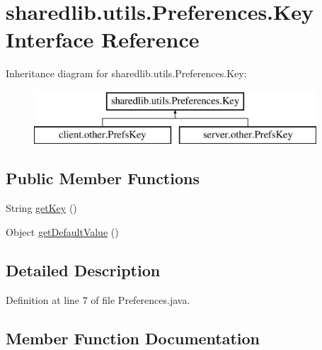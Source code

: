 \hypertarget{interfacesharedlib_1_1utils_1_1_preferences_1_1_key}{}\section{sharedlib.\+utils.\+Preferences.\+Key Interface Reference}
\label{interfacesharedlib_1_1utils_1_1_preferences_1_1_key}
Inheritance diagram for sharedlib.\+utils.\+Preferences.\+Key\+:\begin{figure}[H]
\begin{center}
\leavevmode
\includegraphics[height=2.000000cm]{interfacesharedlib_1_1utils_1_1_preferences_1_1_key}
\end{center}
\end{figure}
\subsection*{Public Member Functions}
\begin{DoxyCompactItemize}
\item 
String \hyperlink{interfacesharedlib_1_1utils_1_1_preferences_1_1_key_a966e1acb44cc01f82c1b0d80c83d185d}{get\+Key} ()
\item 
Object \hyperlink{interfacesharedlib_1_1utils_1_1_preferences_1_1_key_ab68710164c21a369f40429b1d41eb59e}{get\+Default\+Value} ()
\end{DoxyCompactItemize}


\subsection{Detailed Description}


Definition at line 7 of file Preferences.\+java.



\subsection{Member Function Documentation}
\hypertarget{interfacesharedlib_1_1utils_1_1_preferences_1_1_key_ab68710164c21a369f40429b1d41eb59e}{}\label{interfacesharedlib_1_1utils_1_1_preferences_1_1_key_ab68710164c21a369f40429b1d41eb59e} 
